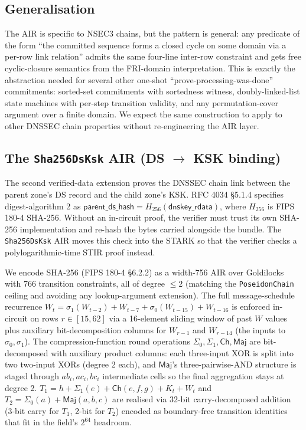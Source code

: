 \documentclass[11pt,a4paper]{article}
\theoremstyle{definition}
\theoremstyle{plain}
\newcommand{\hash}{\ensuremath{H}}
\begin{document}
\subsection{Generalisation}

The AIR is specific to NSEC3 chains, but the pattern is general: any
predicate of the form ``the committed sequence forms a closed cycle on
some domain via a per-row link relation'' admits the same four-line
inter-row constraint and gets free cyclic-closure semantics from the
FRI-domain interpretation.  This is exactly the abstraction needed for
several other one-shot ``prove-processing-was-done'' commitments:
sorted-set commitments with sortedness witness, doubly-linked-list
state machines with per-step transition validity, and any
permutation-cover argument over a finite domain.  We expect the same
construction to apply to other DNSSEC chain properties without
re-engineering the AIR layer.

\subsection{The \texttt{Sha256DsKsk} AIR (DS $\to$ KSK binding)}
\label{sec:sha256-dsksk}

The second verified-data extension proves the DNSSEC chain link
between the parent zone's DS record and the child zone's KSK.  RFC
4034 \S5.1.4 specifies digest-algorithm 2 as
$\mathsf{parent\_ds\_hash} = \hash_{256}(\mathsf{dnskey\_rdata})$,
where $\hash_{256}$ is FIPS 180-4 SHA-256.  Without an in-circuit
proof, the verifier must trust its own SHA-256 implementation and
re-hash the bytes carried alongside the bundle.  The
\texttt{Sha256DsKsk} AIR moves this check into the STARK so that the
verifier checks a polylogarithmic-time STIR proof instead.

We encode SHA-256 (FIPS 180-4 \S6.2.2) as a width-756 AIR over
Goldilocks with 766 transition constraints, all of degree
$\le 2$ (matching the \texttt{PoseidonChain} ceiling and avoiding any
lookup-argument extension).  The full message-schedule recurrence
$W_t = \sigma_1(W_{t-2}) + W_{t-7} + \sigma_0(W_{t-15}) + W_{t-16}$
is enforced in-circuit on rows $r \in [15, 62]$ via a 16-element
sliding window of past $W$ values plus auxiliary bit-decomposition
columns for $W_{r-1}$ and $W_{r-14}$ (the inputs to $\sigma_0,
\sigma_1$).  The compression-function round operations
$\Sigma_0, \Sigma_1, \mathsf{Ch}, \mathsf{Maj}$ are bit-decomposed
with auxiliary product columns: each three-input XOR is split into
two two-input XORs (degree 2 each), and $\mathsf{Maj}$'s
three-pairwise-AND structure is staged through $ab_i, ac_i, bc_i$
intermediate cells so the final aggregation stays at degree 2.
$T_1 = h + \Sigma_1(e) + \mathsf{Ch}(e,f,g) + K_t + W_t$ and $T_2 =
\Sigma_0(a) + \mathsf{Maj}(a,b,c)$ are realised via 32-bit
carry-decomposed addition (3-bit carry for $T_1$, 2-bit for $T_2$)
encoded as boundary-free transition identities that fit in the
field's $2^{64}$ headroom.
\end{document}
